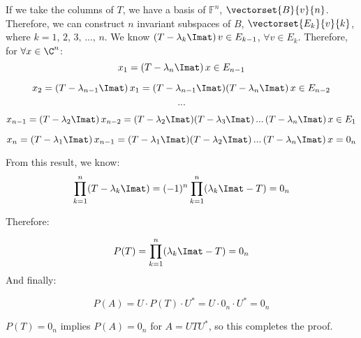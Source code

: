 If we take the columns of $T$, we have a basis of $\mathbb{F}^n$, $\vectorset{B}{v}{n}$. Therefore, we can construct $n$ invariant subspaces of $B$, $\vectorset{E_k}{v}{k}$, where $k=1,\,2,\,3,\,...,\,n$. We know $(T-\lambda_k\Imat)\,v\in E_{k-1}$, $\forall v \in E_k$. Therefore, for $\forall x \in \C^n$:\\

$$x_1=(T-\lambda_n\Imat)\,x \in E_{n-1}$$

$$x_2=(T-\lambda_{n-1}\Imat)\,x_1=(T-\lambda_{n-1}\Imat)(T-\lambda_n\Imat)\,x \in E_{n-2}$$

$$...$$

$$x_{n-1}=(T-\lambda_{2}\Imat)\,x_{n-2}=(T-\lambda_{2}\Imat)(T-\lambda_3\Imat)\,...\,(T-\lambda_n\Imat)\,x \in E_{1}$$

$$x_{n}=(T-\lambda_{1}\Imat)\,x_{n-1}=(T-\lambda_{1}\Imat)(T-\lambda_2\Imat)\,...\,(T-\lambda_n\Imat)\,x =0_n$$

From this result, we know:\\

$$\prod_{k=1}^{n}(T-\lambda_k\Imat)=(-1)^n\prod_{k=1}^{n}(\lambda_k\Imat-T)=0_n$$

Therefore:

$$P(T)=\prod_{k=1}^{n}(\lambda_k\Imat-T)=0_n$$
 And finally:
 
$$P(A)=U\cdot P(T)\cdot U^*=U\cdot 0_n\cdot U^*=0_n$$


$P(T)=0_n$ implies $P(A)=0_n$ for $A=UTU^*$, so this completes the proof.\\